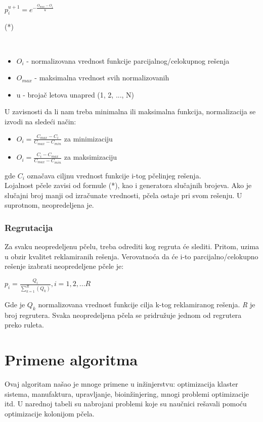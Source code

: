 \documentclass[a4paper]{article}
\begin{document}
{{\centerline{$p_i^{u+1}=e^{-\frac{O_{max}-O_i}{u}}$} \hfill (*)}\\                             
\begin{itemize}
\item$O_i$ - normalizovana vrednost funkcije parcijalnog/celokupnog rešenja
\item $O_{max}$ - maksimalna vrednost svih normalizovanih
\item u - brojač letova unapred (1, 2, ..., N)
\end{itemize}

     U zavisnosti da li nam treba minimalna ili maksimalna funkcija, normalizacija 
se izvodi na sledeći način:
\begin{itemize}
\item$O_i=\frac{C_{max}-C_i}{C_{max}-C_{min}}$ za minimizaciju
\item$O_i=\frac{C_i-C_{max}}{C_{max}-C_{min}}$ za maksimizaciju
\end{itemize}
gde $C_i$ označava ciljnu vrednost funkcije i-tog pčelinjeg rešenja. \\

Lojalnost pčele zavisi od formule (*), kao i generatora slučajnih brojeva. Ako je slučajni broj manji od izračunate vrednosti, pčela ostaje pri svom rešenju. U suprotnom, neopredeljena je\cite{algoritam}.


\subsubsection{Regrutacija}
\label{subsubsec:regrutacija}

Za svaku neopredeljenu pčelu, treba odrediti kog regruta će slediti. Pritom, uzima u obzir kvalitet reklamiranih rešenja. Verovatnoća da će i-to parcijalno/celokupno rešenje izabrati neopredeljene pčele je: \\

\centerline{$p_i = \frac{Q_i}{\sum_{k=1}^{R}(Q_k)},	    i = 1, 2, . . . R$}

Gde je {\em $Q_k$} normalizovana vrednost funkcije cilja k-tog reklamiranog rešenja. {\em R} je broj regrutera. Svaka neopredeljena pčela se pridružuje jednom od regrutera preko ruleta\cite{bcoalg}.


\section{Primene algoritma}
Ovaj algoritam našao je mnoge primene u inžinjerstvu: optimizacija klaster sistema, manufaktura, upravljanje, bioinžinjering, mnogi problemi optimizacije itd.
U narednoj tabeli su nabrojani problemi koje su naučnici rešavali pomoću optimizacije kolonijom pčela.

}
\end{document}
